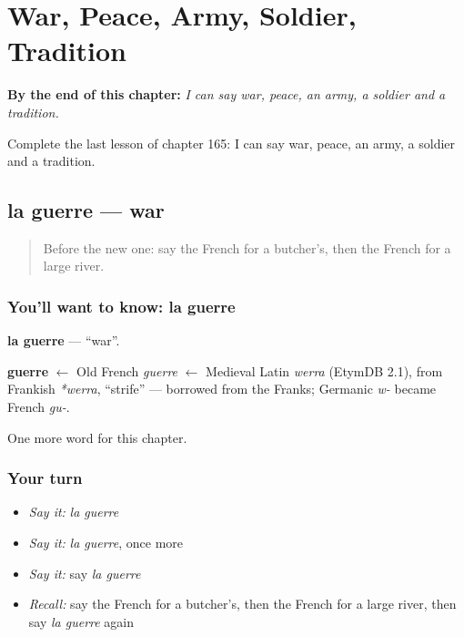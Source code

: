 
\chapter{War, Peace, Army, Soldier, Tradition}
\label{ch:fr-war-peace-army-soldier-tradition}

\begin{chapteropening}
\textbf{By the end of this chapter:} \emph{I can say war, peace, an army, a soldier and a tradition.}

Complete the last lesson of chapter 165: I can say war, peace, an army, a soldier and a tradition.
\end{chapteropening}

\section[la guerre]{la guerre — war}

\label{lesson:FR-C165-guerre}



\begin{quote}
Before the new one: say the French for a butcher's, then the French for a large river.
\end{quote}

\subsection*{You'll want to know: la guerre}
\textbf{la guerre} — \textquotedblleft{}war\textquotedblright{}.

\begin{cousinweb}
\textbf{guerre} $\leftarrow$ Old French \emph{guerre} $\leftarrow$ Medieval Latin \emph{werra} (EtymDB 2.1), from Frankish \emph{*werra}, \textquotedblleft{}strife\textquotedblright{} — borrowed from the Franks; Germanic \emph{w-} became French \emph{gu-}.
\end{cousinweb}

\begin{grammarlens}[title={What you've built}]
One more word for this chapter.
\end{grammarlens}

\subsection*{Your turn}
\begin{itemize}
\raggedright
  \item \emph{Say it:} \emph{la guerre}
  \item \emph{Say it:} \emph{la guerre}, once more
  \item \emph{Say it:} say \emph{la guerre}
  \item \emph{Recall:} say the French for a butcher's, then the French for a large river, then say \emph{la guerre} again
\end{itemize}

